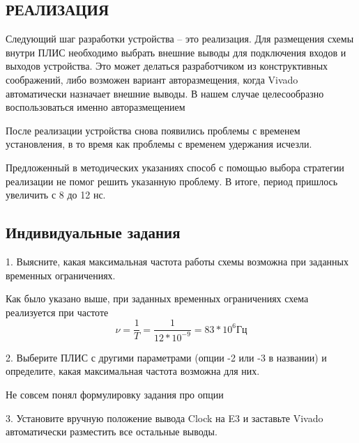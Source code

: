 \begin{sloppypar}
\newpage
\subsection{РЕАЛИЗАЦИЯ} %
Следующий шаг разработки устройства – это реализация. Для размещения схемы внутри ПЛИС необходимо выбрать внешние выводы для подключения входов и выходов устройства. Это может делаться разработчиком из
конструктивных соображений, либо возможен вариант авторазмещения, когда Vivado автоматически назначает внешние выводы. В нашем случае целесообразно воспользоваться именно авторазмещением


После реализации устройства снова появились проблемы с временем установления, в то время как проблемы с временем удержания исчезли.


Предложенный в методических указаниях способ с помощью выбора стратегии реализации не помог решить указанную проблему. В итоге, период пришлось увеличить с 8 до 12 нс. 
\newpage
\subsection{Индивидуальные задания}%
1. Выясните, какая максимальная частота работы схемы возможна при заданных временных ограничениях.

Как было указано выше, при заданных временных ограничениях схема реализуется при частоте  	\begin{displaymath}\nu=\frac{1}{T}=\frac{1}{12*10^{-9}}=83*10^6 Гц\end{displaymath}


2. Выберите ПЛИС с другими параметрами (опции -2 или -3 в названии) и определите, какая максимальная частота возможна для них.

Не совсем понял формулировку задания про опции

3. Установите вручную положение вывода Clock на E3 и заставьте Vivado автоматически разместить все остальные выводы.


\end{sloppypar}
